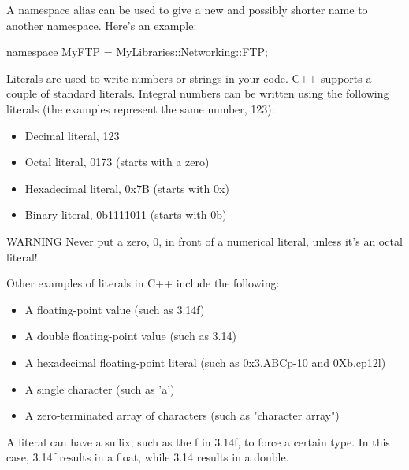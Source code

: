 
A namespace alias can be used to give a new and possibly shorter name to another namespace. Here’s an example:

\begin{cpp}
namespace MyFTP = MyLibraries::Networking::FTP;
\end{cpp}


Literals are used to write numbers or strings in your code. C++ supports a couple of standard literals. Integral numbers can be written using the following literals (the examples represent the same number, 123):

\begin{itemize}
\item
Decimal literal, 123

\item
Octal literal, 0173 (starts with a zero)

\item
Hexadecimal literal, 0x7B (starts with 0x)

\item
Binary literal, 0b1111011 (starts with 0b)
\end{itemize}

\begin{myWarning}{WARNING}
Never put a zero, 0, in front of a numerical literal, unless it’s an octal literal!
\end{myWarning}

Other examples of literals in C++ include the following:

\begin{itemize}
\item
A floating-point value (such as 3.14f)

\item
A double floating-point value (such as 3.14)

\item
A hexadecimal floating-point literal (such as 0x3.ABCp-10 and 0Xb.cp12l)

\item
A single character (such as 'a')

\item
A zero-terminated array of characters (such as "character array")
\end{itemize}

A literal can have a suffix, such as the f in 3.14f, to force a certain type. In this case, 3.14f results in a float, while 3.14 results in a double.

